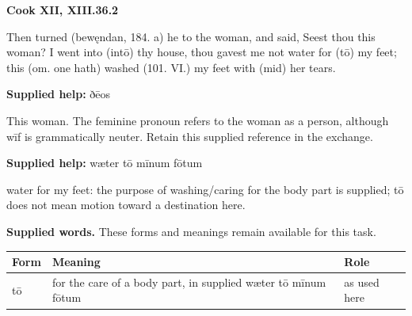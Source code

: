 \par\begin{minipage}{\linewidth}\raggedright
\textbf{Cook XII, XIII.36.2}

Then turned (bewęndan, 184. a) he to the woman, and said, Seest thou this woman? I went into (intō) thy house, thou gavest me not water for (tō) my feet; this (om. one hath) washed (101. VI.) my feet with (mid) her tears.

\textbf{Supplied help:} ðēos

This woman. The feminine pronoun refers to the woman as a person, although wīf is grammatically neuter. Retain this supplied reference in the exchange.

\textbf{Supplied help:} wæter tō mīnum fōtum

water for my feet: the purpose of washing/\allowbreak{}caring for the body part is supplied; tō does not mean motion toward a destination here.

\end{minipage}\par\addvspace{4pt}

\textbf{Supplied words.} These forms and meanings remain available for this task.

\par\begingroup
\fontsize{10.5}{13.2}\selectfont
\setlength{\LTleft}{0pt}\setlength{\LTright}{\fill}
\noindent
\begin{tabular}{@{}>{\raggedright\arraybackslash}p{22.83mm}>{\raggedright\arraybackslash}p{72.72mm}>{\raggedright\arraybackslash}p{22.83mm}@{}}
\toprule
\textbf{Form} & \textbf{Meaning} & \textbf{Role} \\
\midrule
tō & for the care of a body part, in supplied wæter tō mīnum fōtum & as used here \\
\bottomrule
\end{tabular}
\par\endgroup

